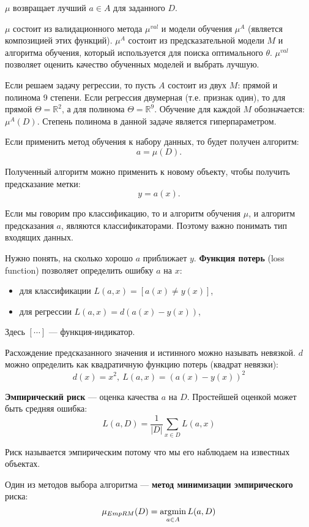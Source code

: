 $\mu$ возвращает лучший $a \in A$  для заданного $D$.

$\mu$ состоит из валидационного метода $\mu^{val}$ и модели обучения $\mu^{A}$
(является композицией этих функций). $\mu^A$ состоит из предсказательной модели
$M$ и алгоритма обучения, который используется для поиска оптимального $\theta$.
$\mu^{val}$ позволяет оценить качество обученных моделей и выбрать лучшую.

Если решаем задачу регрессии, то пусть $A$ состоит из двух $M$: прямой и
полинома 9 степени. Если регрессия двумерная (т.е. признак один), то для прямой $\Theta = \mathbb{R}^2$,
а для полинома $\Theta = \mathbb{R}^{9}$. Обучение для каждой $M$ обозначается: $\mu^A(D)$.
Степень полинома в данной задаче является гиперпараметром.

Если применить метод обучения к набору данных, то будет получен алгоритм:
\[
    a = \mu(D).
\]

Полученный алгоритм можно применить к новому объекту, чтобы получить
предсказание метки:
\[
    y = a(x).
\]

Если мы говорим про классификацию, то и алгоритм обучения $\mu$, и алгоритм
предсказания $a$, являются классификаторами. Поэтому важно понимать тип
входящих данных.

Нужно понять, на сколько хорошо $a$ приближает $y$. \textbf{Функция потерь}
(loss function) позволяет определить ошибку $a$ на $x$:
\begin{itemize}
    \item для классификации $L(a, x) = [a(x) \neq y(x)]$,
    \item для регрессии $L(a, x) = d(a(x) - y(x))$,
\end{itemize}

Здесь $[ \cdots ]$ --- функция-индикатор.

Расхождение предсказанного значения и истинного можно называть невязкой. 
$d$ можно определить как квадратичную функцию потерь (квадрат невязки):
\[
    d(x) = x^2,\ L(a, x) = (a(x) - y(x))^2
\]

\textbf{Эмпирический риск} --- оценка качества $a$ на $D$. Простейшей оценкой
может быть средняя ошибка:
\[
    L(a, D) = \frac{1}{|D|}\sum_{x \in D} L(a, x)
\]

Риск называется эмпирическим потому что мы его наблюдаем на известных объектах.

Один из методов выбора алгоритма --- \textbf{метод минимизации эмпирического}
риска:
\[
    \mu_{EmpRM}(D) = \operatorname*{argmin}_{a \in A}L(a, D)
\]

